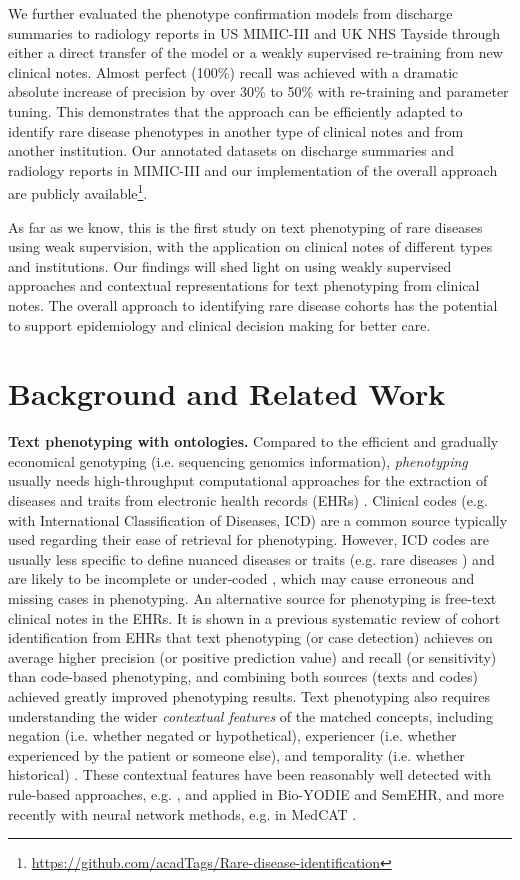 \documentclass[twocolumn]{bmcart}
\begin{document}
We further evaluated the phenotype confirmation models from discharge summaries to radiology reports in US MIMIC-III and UK NHS Tayside through either a direct transfer of the model or a weakly supervised re-training from new clinical notes. Almost perfect (100\%) recall was achieved with a dramatic absolute increase of precision by over 30\% to 50\% with re-training and parameter tuning. This demonstrates that the approach can be efficiently adapted to identify rare disease phenotypes in another type of clinical notes and from another institution. Our annotated datasets on discharge summaries and radiology reports in MIMIC-III and our implementation of the overall approach are publicly available\footnote{\url{https://github.com/acadTags/Rare-disease-identification}}.

As far as we know, this is the first study on text phenotyping of rare diseases using weak supervision, with the application on clinical notes of different types and institutions. Our findings will shed light on using weakly supervised approaches and contextual representations for text phenotyping from clinical notes. The overall approach to identifying rare disease cohorts has the potential to support epidemiology and clinical decision making for better care. 

\section*{Background and Related Work}
\label{sec:related-work}
\textbf{Text phenotyping with ontologies.} Compared to the efficient and gradually economical genotyping (i.e. sequencing genomics information), \emph{phenotyping} usually needs high-throughput computational approaches for the extraction of diseases and traits from electronic health records (EHRs) \cite{Pathak2013,Chen2013}. Clinical codes (e.g. with International Classification of Diseases, ICD) are a common source typically used regarding their ease of retrieval for phenotyping. However, ICD codes are usually less specific to define nuanced diseases or traits (e.g. rare diseases \cite{richesson2014}) and are likely to be incomplete or under-coded \cite{searle2020}, which may cause erroneous and missing cases in phenotyping. An alternative source for phenotyping is free-text clinical notes in the EHRs. It is shown in a previous systematic review of cohort identification from EHRs \cite{Ford2016} that text phenotyping (or case detection) achieves on average higher precision (or positive prediction value) and recall (or sensitivity) than code-based phenotyping, and combining both sources (texts and codes) achieved greatly improved phenotyping results. Text phenotyping also requires understanding the wider \emph{contextual features} of the matched concepts, including negation (i.e. whether negated or hypothetical), experiencer (i.e. whether experienced by the patient or someone else), and temporality (i.e. whether historical) \cite{Harkema2009context,wu2019}. These contextual features have been reasonably well detected with rule-based approaches, e.g. \cite{Harkema2009context}, and applied in Bio-YODIE and SemEHR, and more recently with neural network methods, e.g. in MedCAT \cite{Kraljevic2021}. 
\end{document}
